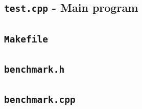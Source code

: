 \documentclass[titlepage]{article}
\begin{document}
\clearpage
\subsection{\texttt{test.cpp} - Main program}


\subsection{\texttt{Makefile}}


\clearpage
\subsection{\texttt{benchmark.h}}


\clearpage
\subsection{\texttt{benchmark.cpp}}

\end{document}
